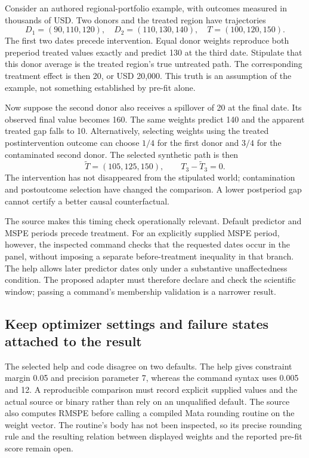 Consider an authored regional-portfolio example, with outcomes measured in
thousands of USD. Two donors and the treated region have trajectories
\begin{equation}
 D_1=(90,110,120),\quad D_2=(110,130,140),\quad T=(100,120,150).
 \label{exec19:synth-paths}
\end{equation}
The first two dates precede intervention. Equal donor weights reproduce both
preperiod treated values exactly and predict 130 at the third date. Stipulate
that this donor average is the treated region's true untreated path. The
corresponding treatment effect is then 20, or USD 20,000. This truth is an
assumption of the example, not something established by pre-fit alone.
\citep{exec19_synth_contract_reference}

Now suppose the second donor also receives a spillover of 20 at the final date.
Its observed final value becomes 160. The same weights predict 140 and the
apparent treated gap falls to 10. Alternatively, selecting weights using the
treated postintervention outcome can choose $1/4$ for the first donor and $3/4$
for the contaminated second donor. The selected synthetic path is then
\begin{equation}
 \widetilde T=(105,125,150),\qquad T_3-\widetilde T_3=0.
 \label{exec19:synth-leakage}
\end{equation}
The intervention has not disappeared from the stipulated world; contamination
and postoutcome selection have changed the comparison. A lower postperiod gap
cannot certify a better causal counterfactual.~\citep{exec19_synth_contract_reference}

The source makes this timing check operationally relevant. Default predictor
and MSPE periods precede treatment. For an explicitly supplied MSPE period,
however, the inspected command checks that the requested dates occur in the
panel, without imposing a separate before-treatment inequality in that branch.
The help allows later predictor dates only under a substantive unaffectedness
condition. The proposed adapter must therefore declare and check the scientific
window; passing a command's membership validation is a narrower result.
\citep{exec19_synth_stata_source}

\subsection{Keep optimizer settings and failure states attached to the result}
\label{exec19:synth-numerics}

The selected help and code disagree on two defaults. The help gives constraint
margin 0.05 and precision parameter 7, whereas the command syntax uses 0.005 and
12. A reproducible comparison must record explicit supplied values and the
actual source or binary rather than rely on an unqualified default. The source
also computes RMSPE before calling a compiled Mata rounding routine on the
weight vector. The routine's body has not been inspected, so its precise
rounding rule and the resulting relation between displayed weights and the
reported pre-fit score remain open.~\citep{exec19_synth_stata_source}

